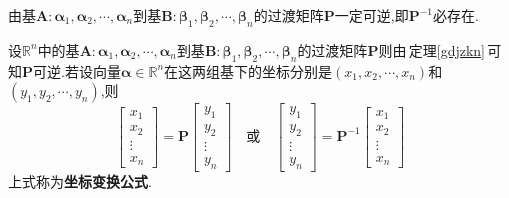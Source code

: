 \documentclass[9pt,a4paper]{book}
\begin{document}
\begin{theorem}\label{gdjzkn}
	由基$ \bm{A}:\bm{\alpha}_1,\bm{\alpha}_2,\cdots,\bm{\alpha}_n $到基$ \bm{B}:\bm{\beta}_1,\bm{\beta}_2,\cdots,\bm{\beta}_n $的过渡矩阵$ \bm{P} $一定可逆,即$ \bm{P}^{-1} $必存在.
\end{theorem}
\begin{theorem}[坐标变换公式]
	设$ \mathbb{R}^n $中的基$ \bm{A}:\bm{\alpha}_1,\bm{\alpha}_2,\cdots,\bm{\alpha}_n $到基$ \bm{B}:\bm{\beta}_1,\bm{\beta}_2,\cdots,\bm{\beta}_n $的过渡矩阵$ \bm{P} $则由\,定理\ref{gdjzkn}\,可知$ \bm{P} $可逆.若设向量$ \bm{\alpha}\in\mathbb{R}^n $在这两组基下的坐标分别是$ (x_1,x_2,\cdots,x_n) $和$ (y_1,y_2,\cdots,y_n) $,则\[ 
	\begin{bmatrix}
	 x_1\\x_2\\\vdots\\x_n
	\end{bmatrix}=\bm{P}
	\begin{bmatrix}
	y_1\\y_2\\\vdots\\y_n
	\end{bmatrix}\quad\mbox{或}\quad
		\begin{bmatrix}
	y_1\\y_2\\\vdots\\y_n
	\end{bmatrix}=\bm{P}^{-1}\begin{bmatrix}
	x_1\\x_2\\\vdots\\x_n
	\end{bmatrix} \]
	上式称为\textbf{坐标变换公式}.
\end{theorem}
\end{document}
